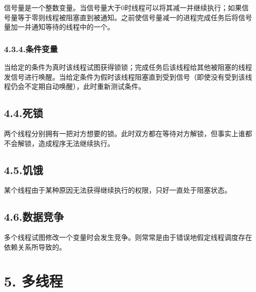\documentclass{article}
\begin{document}
\noindent{}信号量是一个整数变量。当信号量大于0时线程可以将其减一并继续执行；如果信号量等于零则线程被阻塞直到被通知。之前使信号量减一的进程完成任务后将信号量加一并通知等待的线程中的一个。%

\subsubsection{4.3.4.\hspace*{0.5em}条件变量}\label{section}%

\noindent{}当给定的条件为真时该线程试图获得锁锁；完成任务后该线程给其他被阻塞的线程发信号进行唤醒。当给定条件为假时该线程阻塞直到受到信号（即使没有受到该线程仍会不定期自动唤醒），此时重新测试条件。%

\subsection{4.4.\hspace*{0.5em}死锁}\label{section}%

\noindent{}两个线程分别拥有一把对方想要的锁。此时双方都在等待对方解锁，但事实上谁都不会解锁，造成程序无法继续执行。%

\subsection{4.5.\hspace*{0.5em}饥饿}\label{section}%

\noindent{}某个线程由于某种原因无法获得继续执行的权限，只好一直处于阻塞状态。%

\subsection{4.6.\hspace*{0.5em}数据竞争}\label{section}%

\noindent{}多个线程试图修改一个变量时会发生竞争。则常常是由于错误地假定线程调度存在依赖关系所导致的。%

\section{5.\hspace*{0.5em} 多线程 }\label{sec-windows-api}%
\end{document}
